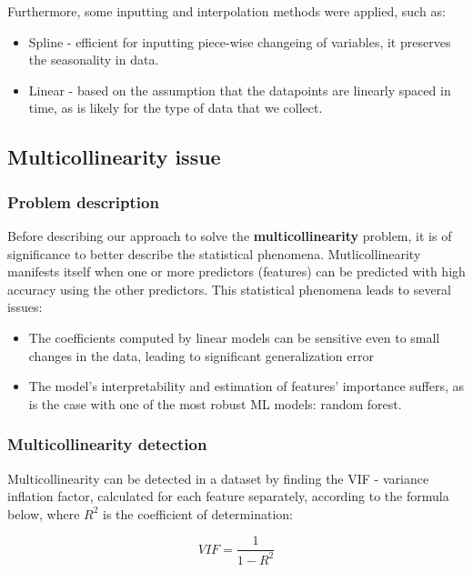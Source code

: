 \documentclass[conference]{IEEEtran}
\begin{document}
Furthermore, some inputting and interpolation methods were applied, such as:
\begin{itemize}
	\item Spline - efficient for inputting piece-wise changeing of variables, it preserves the seasonality in data.
	\item Linear - based on the assumption that the datapoints are linearly spaced in time, as is likely for the type of data that we collect.	
\end{itemize}

\subsection{Multicollinearity issue}

\subsubsection{Problem description}

Before describing our approach to solve the \textbf{multicollinearity} problem, it is of significance to better describe the statistical phenomena. Mutlicollinearity manifests itself when one or more predictors (features) can be predicted with high accuracy using the other predictors. This statistical phenomena leads to several issues:

\begin{itemize}
	\item The coefficients computed by linear models can be sensitive even to small changes in the data, leading to significant generalization error
	\item The model's interpretability and estimation of features' importance suffers, as is the case with one of the most robust ML models: random forest\cite{sklearn_permutation}.	
\end{itemize}

\subsubsection{Multicollinearity detection}

Multicollinearity can be detected in a dataset by finding the VIF - variance inflation factor, calculated for each feature separately, according to the formula below, where $R^2$ is the coefficient of determination: 

\begin{equation}
	VIF=\frac{1}{1-R^2}
\end{equation}
\end{document}
